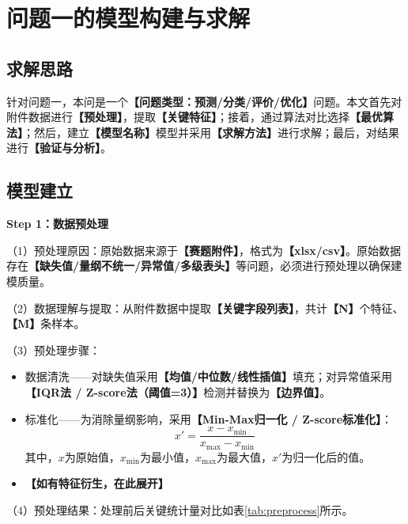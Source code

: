 
\section{问题一的模型构建与求解}

\subsection{求解思路}

针对问题一，本问是一个\textbf{【问题类型：预测/分类/评价/优化】}问题。本文首先对附件数据进行\textbf{【预处理】}，提取\textbf{【关键特征】}；接着，通过算法对比选择\textbf{【最优算法】}；然后，建立\textbf{【模型名称】}模型并采用\textbf{【求解方法】}进行求解；最后，对结果进行\textbf{【验证与分析】}。

\subsection{模型建立}

\textbf{Step 1：数据预处理}

（1）预处理原因：原始数据来源于\textbf{【赛题附件】}，格式为\textbf{【xlsx/csv】}。原始数据存在\textbf{【缺失值/量纲不统一/异常值/多级表头】}等问题，必须进行预处理以确保建模质量。

（2）数据理解与提取：从附件数据中提取\textbf{【关键字段列表】}，共计\textbf{【N】}个特征、\textbf{【M】}条样本。

（3）预处理步骤：
\begin{itemize}
  \item 数据清洗——对缺失值采用\textbf{【均值/中位数/线性插值】}填充；对异常值采用\textbf{【IQR法 / Z-score法（阈值=3）】}检测并替换为\textbf{【边界值】}。
  \item 标准化——为消除量纲影响，采用\textbf{【Min-Max归一化 / Z-score标准化】}：
  \begin{equation}
  x' = \frac{x - x_{\min}}{x_{\max} - x_{\min}}
  \end{equation}
  其中，$x$为原始值，$x_{\min}$为最小值，$x_{\max}$为最大值，$x'$为归一化后的值。
  \item \textbf{【如有特征衍生，在此展开】}
\end{itemize}

（4）预处理结果：处理前后关键统计量对比如表\ref{tab:preprocess}所示。

